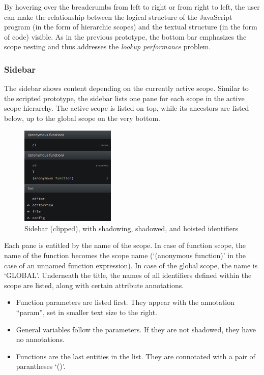 By hovering over the breadcrumbs from left to right or from right to
left, the user can make the relationship between the logical structure
of the JavaScript program (in the form of hierarchic scopes) and the
textual structure (in the form of code) visible. As in the previous
prototype, the bottom bar emphasizes the scope nesting and thus
addresses the \emph{lookup performance} problem.

\subsubsection{Sidebar}\label{sidebar}

The sidebar shows content depending on the currently active scope.
Similar to the scripted prototype, the sidebar lists one pane for each
scope in the active scope hierarchy. The active scope is listed on top,
while its ancestors are listed below, up to the global scope on the very
bottom.

\begin{figure}[H]
\centering
\includegraphics[keepaspectratio,width=0.4\textwidth]{img/sidebar.png}
\caption{Sidebar (clipped), with shadowing, shadowed, and hoisted identifiers}
\label{fig:protosidebar}
\end{figure}

Each pane is entitled by the name of the scope. In case of function
scope, the name of the function becomes the scope name (‘(anonymous
function)’ in the case of an unnamed function expression). In case of
the global scope, the name is ‘GLOBAL’. Underneath the title, the names
of all identifiers defined within the scope are listed, along with
certain attribute annotations.

\begin{itemize}
\itemsep1pt\parskip0pt
\item
  Function parameters are listed first. They appear with the annotation
  “param”, set in smaller text size to the right.
\item
  General variables follow the parameters. If they are not shadowed,
  they have no annotations.
\item
  Functions are the last entities in the list. They are connotated with
  a pair of parantheses ‘()’.
\end{itemize}

